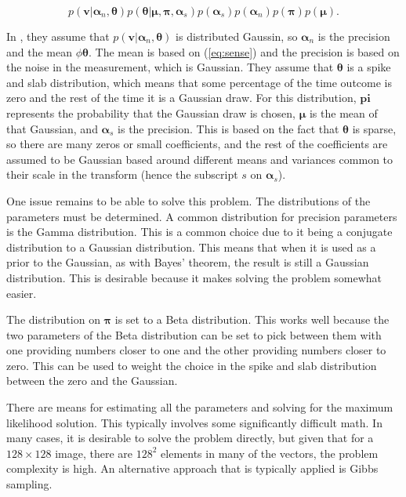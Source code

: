 \documentclass{IEEEtran}
\begin{document}
\begin{equation}
p(\mathbf{v}|\mathbf{\alpha}_n,\mathbf{\theta})p(\mathbf{\theta}|\mathbf{\mu},\mathbf{\pi},\mathbf{\alpha}_s)p(\mathbf{\alpha}_s)p(\mathbf{\alpha}_n)p(\mathbf{\pi})p(\mathbf{\mu}).
\label{bayesprimary}
\end{equation}

In \cite{He09}, they assume that
$p(\mathbf{v}|\mathbf{\alpha}_n,\mathbf{\theta})$ is distributed Gaussin,
so $\mathbf{\alpha}_n$ is the precision and the mean $\phi
\mathbf{\theta}$.  The mean is based on (\ref{eq:sense}) and the
precision is based on the noise in the measurement, which is
Gaussian.  They assume that $\mathbf{\theta}$ is a spike
and slab distribution, which means that some percentage of the time
outcome is zero and the rest of the time it is a Gaussian draw.  For this distribution,
$\mathbf{pi}$ represents the probability that the Gaussian draw is
chosen, $\mathbf{\mu}$ is the mean of that Gaussian, and
$\mathbf{\alpha}_s$ is the precision.  This is based on the fact that
$\mathbf{\theta}$ is sparse, so there are many zeros or small
coefficients, and the rest of the coefficients are assumed to be
Gaussian based around different means and variances common to their
scale in the transform (hence the subscript $s$ on
$\mathbf{\alpha}_s$).

One issue remains to be able to solve this problem.  The distributions of the
parameters must be determined.  A common distribution for precision
parameters is the Gamma distribution.  This is a common choice due to
it being a conjugate distribution to a Gaussian distribution.  This
means that when it is used as a prior to the Gaussian, as with Bayes'
theorem, the result is still a Gaussian distribution.  This is
desirable because it makes solving the problem somewhat easier. 

The distribution on $\mathbf{\pi}$ is set to a Beta distribution.  This
works well because the two parameters of the Beta distribution can be
set to pick between them with one providing numbers closer to one and
the other providing numbers closer to zero.  This can be used to
weight the choice in the spike and slab distribution between the zero
and the Gaussian.  

There are means for estimating all the parameters and solving for the
maximum likelihood solution.  This typically involves some
significantly difficult math.  In many cases, it is desirable to solve
the problem directly, but given that for a $128\times128$ image, there
are $128^2$ elements in many of the vectors, the problem complexity is
high.  An alternative approach that is typically applied is Gibbs
sampling.
\end{document}
